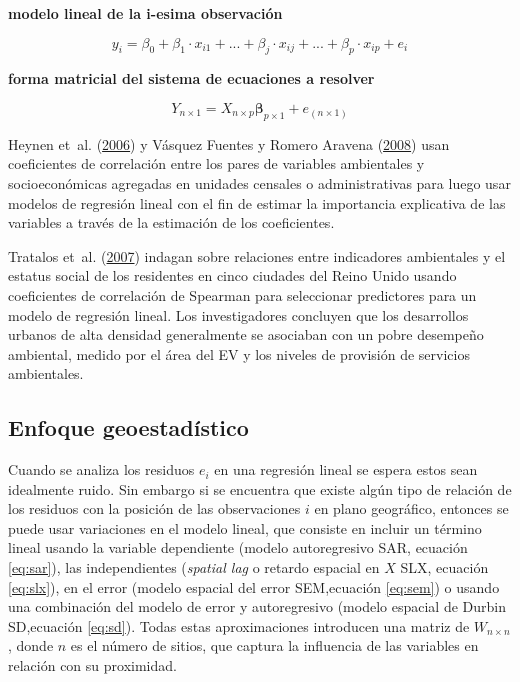\documentclass[12pt,a4paper,oneside, openany]{book}
\theoremstyle{definition}
\theoremstyle{definition}
\theoremstyle{definition}
\theoremstyle{remark}
\begin{document}
\textbf{modelo lineal de la i-esima observación}

\begin{equation}
y_i=\beta_0+ \beta_1\cdot  x_{i1}+...+\beta_j\cdot  x_{ij}+...+\beta_p\cdot  x_{ip}+e_i
\label{eq:lmodel}
\end{equation}

\textbf{forma matricial del sistema de ecuaciones a resolver}

\begin{equation}
Y_{n\times 1}=X_{n \times p }\mathbf{\beta}_{p\times 1}+e_{(n\times 1)}
\label{eq:lmodelM}
\end{equation}

Heynen et~al. (\protect\hyperlink{ref-heynen_political_2006}{2006}) y
Vásquez Fuentes y Romero Aravena
(\protect\hyperlink{ref-vasquez_fuentes_vegetacion_2008}{2008}) usan
coeficientes de correlación entre los pares de variables ambientales y
socioeconómicas agregadas en unidades censales o administrativas para
luego usar modelos de regresión lineal con el fin de estimar la
importancia explicativa de las variables a través de la estimación de
los coeficientes.

Tratalos et~al. (\protect\hyperlink{ref-tratalos_urban_2007}{2007})
indagan sobre relaciones entre indicadores ambientales y el estatus
social de los residentes en cinco ciudades del Reino Unido usando
coeficientes de correlación de Spearman para seleccionar predictores
para un modelo de regresión lineal. Los investigadores concluyen que los
desarrollos urbanos de alta densidad generalmente se asociaban con un
pobre desempeño ambiental, medido por el área del EV y los niveles de
provisión de servicios ambientales.

\subsection{Enfoque geoestadístico}\label{enfoque-geoestaduxedstico}

Cuando se analiza los residuos \(e_i\) en una regresión lineal se espera
estos sean idealmente ruido. Sin embargo si se encuentra que existe
algún tipo de relación de los residuos con la posición de las
observaciones \(i\) en plano geográfico, entonces se puede usar
variaciones en el modelo lineal, que consiste en incluir un término
lineal usando la variable dependiente (modelo autoregresivo SAR,
ecuación \eqref{eq:sar}), las independientes (\emph{spatial lag} o retardo
espacial en \(X\) SLX, ecuación \eqref{eq:slx}), en el error (modelo
espacial del error SEM,ecuación \eqref{eq:sem}) o usando una combinación
del modelo de error y autoregresivo (modelo espacial de Durbin
SD,ecuación \eqref{eq:sd}). Todas estas aproximaciones introducen una
matriz de \(W_{n\times n}\), donde \(n\) es el número de sitios, que
captura la influencia de las variables en relación con su proximidad.
\end{document}
